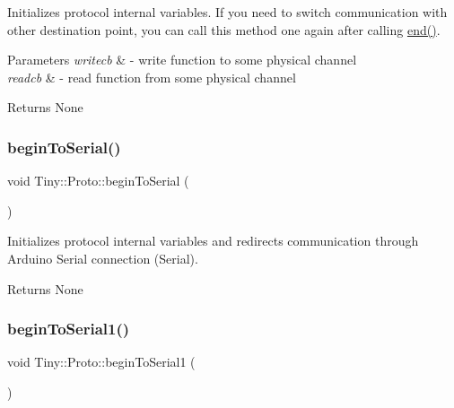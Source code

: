 Initializes protocol internal variables. If you need to switch communication with other destination point, you can call this method one again after calling \hyperlink{classTiny_1_1Proto_ae9f52fa1c4f18981672ad7af12633d4e}{end()}. 
\begin{DoxyParams}{Parameters}
{\em writecb} & -\/ write function to some physical channel \\
\hline
{\em readcb} & -\/ read function from some physical channel \\
\hline
\end{DoxyParams}
\begin{DoxyReturn}{Returns}
None 
\end{DoxyReturn}
\mbox{\label{classTiny_1_1Proto_a1dcad822337b6155148b1da9222fdd82}} 
\subsubsection{\texorpdfstring{begin\+To\+Serial()}{beginToSerial()}}
{\footnotesize\ttfamily void Tiny\+::\+Proto\+::begin\+To\+Serial (\begin{DoxyParamCaption}{ }\end{DoxyParamCaption})\hspace{0.3cm}{\ttfamily [inline]}}

Initializes protocol internal variables and redirects communication through Arduino Serial connection (Serial). \begin{DoxyReturn}{Returns}
None 
\end{DoxyReturn}
\mbox{\label{classTiny_1_1Proto_a707f3112e0ca3651d4b0f3df6c19dd8c}} 
\subsubsection{\texorpdfstring{begin\+To\+Serial1()}{beginToSerial1()}}
{\footnotesize\ttfamily void Tiny\+::\+Proto\+::begin\+To\+Serial1 (\begin{DoxyParamCaption}{ }\end{DoxyParamCaption})\hspace{0.3cm}{\ttfamily [inline]}}

